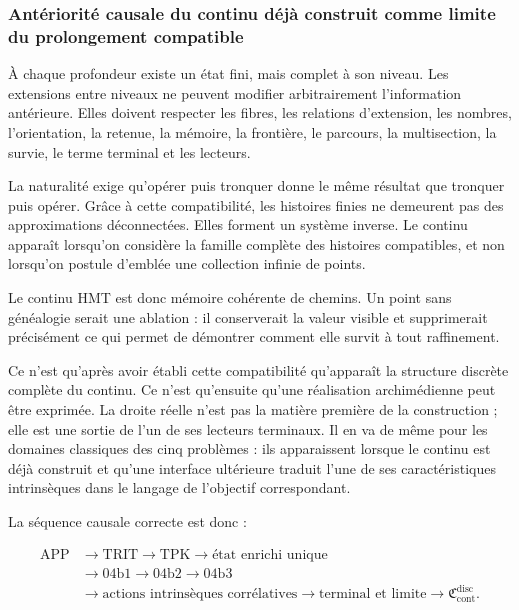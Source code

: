 \subsubsection{Antériorité causale du continu déjà construit comme limite du prolongement compatible}
À chaque profondeur existe un état fini, mais complet à son niveau. Les extensions entre niveaux ne peuvent modifier arbitrairement l’information antérieure. Elles doivent respecter les fibres, les relations d’extension, les nombres, l’orientation, la retenue, la mémoire, la frontière, le parcours, la multisection, la survie, le terme terminal et les lecteurs.\par
La naturalité exige qu’opérer puis tronquer donne le même résultat que tronquer puis opérer. Grâce à cette compatibilité, les histoires finies ne demeurent pas des approximations déconnectées. Elles forment un système inverse. Le continu apparaît lorsqu’on considère la famille complète des histoires compatibles, et non lorsqu’on postule d’emblée une collection infinie de points.\par
Le continu HMT est donc mémoire cohérente de chemins. Un point sans généalogie serait une ablation : il conserverait la valeur visible et supprimerait précisément ce qui permet de démontrer comment elle survit à tout raffinement.\par
Ce n’est qu’après avoir établi cette compatibilité qu’apparaît la structure discrète complète du continu. Ce n’est qu’ensuite qu’une réalisation archimédienne peut être exprimée. La droite réelle n’est pas la matière première de la construction ; elle est une sortie de l’un de ses lecteurs terminaux. Il en va de même pour les domaines classiques des cinq problèmes : ils apparaissent lorsque le continu est déjà construit et qu’une interface ultérieure traduit l’une de ses caractéristiques intrinsèques dans le langage de l’objectif correspondant.\par
La séquence causale correcte est donc :\par
\[
\begin{aligned}
\mathrm{APP}
&\longrightarrow \mathrm{TRIT}
\longrightarrow \mathrm{TPK}
\longrightarrow \text{état enrichi unique}\\
&\longrightarrow 04\mathrm b1
\longrightarrow 04\mathrm b2
\longrightarrow 04\mathrm b3\\
&\longrightarrow \text{actions intrinsèques corrélatives}
\longrightarrow \text{terminal et limite}
\longrightarrow \mathfrak C_{\mathrm{cont}}^{\mathrm{disc}}.
\end{aligned}
\]
